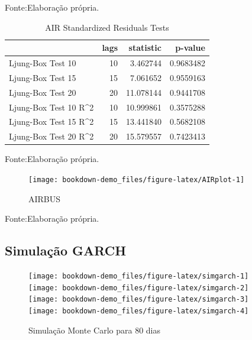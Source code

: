 \documentclass[
  12pt,
  a4paper,
  openany]{book}
\begin{document}
Fonte:Elaboração própria.

\justifying
\bigskip

\begin{table}[!h]

\caption{\label{tab:unnamed-chunk-35}AIR Standardized Residuals Tests}
\centering
\begin{tabular}[t]{lrrr}
\toprule
  & lags & statistic & p-value\\
\midrule
Ljung-Box Test 10 & 10 & 3.462744 & 0.9683482\\
Ljung-Box Test 15 & 15 & 7.061652 & 0.9559163\\
Ljung-Box Test 20 & 20 & 11.078144 & 0.9441708\\
Ljung-Box Test 10 R\textasciicircum{}2 & 10 & 10.999861 & 0.3575288\\
Ljung-Box Test 15 R\textasciicircum{}2 & 15 & 13.441840 & 0.5682108\\
\addlinespace
Ljung-Box Test 20 R\textasciicircum{}2 & 20 & 15.579557 & 0.7423413\\
\bottomrule
\end{tabular}
\end{table}
\FloatBarrier
\centering

Fonte:Elaboração própria.

\justifying
\bigskip
\begin{figure}

{\centering \texttt{[image: bookdown-demo\_files/figure-latex/AIRplot-1]} 

}

\caption{AIRBUS}\label{fig:AIRplot}
\end{figure}
\FloatBarrier
\centering

Fonte:Elaboração própria.

\justifying
\bigskip

\hypertarget{simulauxe7uxe3o-garch}{%
\subsection{Simulação GARCH}\label{simulauxe7uxe3o-garch}}

\scriptsize

\normalsize

\scriptsize

\normalsize

\begin{figure}

{\centering \texttt{[image: bookdown-demo\_files/figure-latex/simgarch-1]} \texttt{[image: bookdown-demo\_files/figure-latex/simgarch-2]} \texttt{[image: bookdown-demo\_files/figure-latex/simgarch-3]} \texttt{[image: bookdown-demo\_files/figure-latex/simgarch-4]} 

}

\caption{Simulação Monte Carlo para 80 dias}\label{fig:simgarch}
\end{figure}
\end{document}
